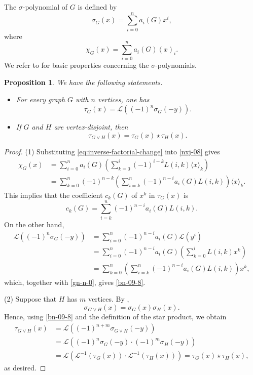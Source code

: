 \documentclass[12pt,a4paper,reqno]{amsart}
\numberwithin{equation}{section}
\newtheorem{proposition}[theorem]{Proposition}
\theoremstyle{definition}
\theoremstyle{remark}
\newcommand{\Lah}{\mathcal L}
\begin{document}
The $\sigma$-polynomial of $G$ is defined by 
\[
\sigma_G(x)=\sum_{i=0}^{n}a_i(G)x^i,
\]
where
\begin{equation}\label{nxj-08}
  \chi_G(x)=\sum_{i=0}^{n}a_i(G)(x)_i.   
\end{equation}
We refer to  \cite{Brenti92,BRW94} for basic properties concerning the $\sigma$-polynomials. 

 

\begin{proposition}\label{prop:join-star}
We have the following statements.
\begin{itemize}
    \item[(1)] For every graph $G$ with $n$ vertices, one has 
\begin{equation}\label{bn-09-8}
\tau_G(x)=\Lah((-1)^n\sigma_G(-y)).    
\end{equation}    
 

    \item[(2)] 
     If $G$ and $H$ are
vertex-disjoint, then
\begin{equation*}
 \tau_{G\vee H}(x)=\tau_G(x)\star\tau_H(x).
\end{equation*}
\end{itemize}


\end{proposition}

\begin{proof}
(1) Substituting \eqref{eq:inverse-factorial-change} into \eqref{nxj-08} gives
\begin{align*}
 \chi_G(x)
 &=\sum_{i=0}^{n}a_i(G)
   \left(\sum_{k=0}^{i}(-1)^{i-k}L(i,k)\langle x\rangle_k\right)\\
 &=\sum_{k=0}^{n}(-1)^{n-k}
   \left(\sum_{i=k}^{n}(-1)^{n-i}a_i(G)L(i,k)\right)
   \langle x\rangle_k.
\end{align*}
This implies that the coefficient $c_k(G)$ of $x^k$
  in $\tau_G(x)$ is 
\begin{equation}\label{gn-n-0}
    c_k(G)=\sum_{i=k}^{n}(-1)^{n-i}a_i(G)L(i,k).
\end{equation}
On the other hand,
\begin{align*}
 \Lah((-1)^n\sigma_G(-y))&=\sum_{i=0}^n(-1)^{n-i}a_i(G)\Lah(y^i)\\
 &=\sum_{i=0}^n(-1)^{n-i}a_i(G)\left(\sum_{k=0}^i L(i,k)x^k\right)\\
 &=\sum_{k=0}^n \left(\sum_{i=k}^{n}(-1)^{n-i}a_i(G)L(i,k)\right)x^k,
\end{align*}
which, together with \eqref{gn-n-0}, gives \eqref{bn-09-8}. 
  
(2) Suppose that $H$ has $m$ vertices.  By \cite[Theorem 3.13]{Brenti92},
\[
\sigma_{G\vee H}(x)=\sigma_G(x) \sigma_H(x).
\]
Hence, using \eqref{bn-09-8} and the definition of the star product, we obtain
\begin{align*}
 \tau_{G\vee H}(x)&=\Lah\left((-1)^{n+m}\sigma_{G\vee H}(-y)\right)\\
 &=\Lah\left((-1)^{n}\sigma_{G}(-y)\cdot (-1)^{m}\sigma_{H}(-y)\right)\\
 &=\Lah\left(\Lah^{-1}(\tau_G(x))\cdot \Lah^{-1}(\tau_H(x))\right)=\tau_G(x)\star\tau_H(x),
\end{align*}
as desired. 
\end{proof}
\end{document}
